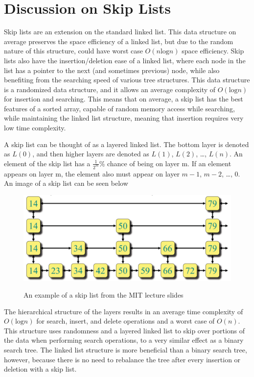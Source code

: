 \documentclass{article}
\begin{document}
\pagebreak

\section*{Discussion on Skip Lists}

Skip lists are an extension on the standard linked list. This data structure on average preserves the space efficiency of a linked list, but due to the random nature of this structure, could have worst case $O(n \text{log} n)$ space efficiency. Skip lists also have the insertion/deletion ease of a linked list, where each node in the list has a pointer to the next (and sometimes previous) node, while also benefiting from the searching speed of various tree structures. This data structure is a randomized data structure, and it allows an average complexity of $O(\text{log} n)$ for insertion and searching. This means that on average, a skip list has the best features of a sorted array, capable of random memory access while searching, while maintaining the linked list structure, meaning that insertion requires very low time complexity. 

A skip list can be thought of as a layered linked list. The bottom layer is denoted as $L(0)$, and then higher layers are denoted as $L(1)$, $L(2)$, \ldots, $L(n)$. An element of the skip list has a $\frac{1}{2^m}$\% chance of being on layer m. If an element appears on layer m, the element also must appear on layer $m-1$, $m-2$, \ldots, $0$. An image of a skip list can be seen below

\begin{figure}[h]
    \centering
    \includegraphics[width=\textwidth,keepaspectratio]{Images/SkipList_MIT.PNG}
    \label{fig:skip_list}
    \caption{An example of a skip list from the MIT lecture slides}
\end{figure}

The hierarchical structure of the layers results in an average time complexity of $O(\text{log} n)$ for search, insert, and delete operations and a worst case of $O(n)$. This structure uses randomness and a layered linked list to skip over portions of the data when performing search operations, to a very similar effect as a binary search tree. The linked list structure is more beneficial than a binary search tree, however, because there is no need to rebalance the tree after every insertion or deletion with a skip list.
\end{document}
